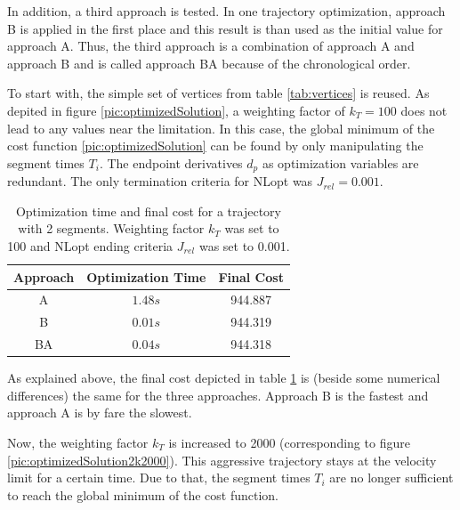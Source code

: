 In addition, a third approach is tested. In one trajectory optimization, approach B is applied in the first place and this result is than used as the initial value for approach A. Thus, the third approach is a combination of approach A and approach B and is called approach BA because of the chronological order. \newline

To start with, the simple set of vertices from table \ref{tab:vertices} is reused. As depited in figure \ref{pic:optimizedSolution}, a weighting factor of $k_T = 100$ does not lead to any values near the limitation. In this case, the global minimum of the cost function \ref{pic:optimizedSolution} can be found by only manipulating the segment times $T_i$. The endpoint derivatives $d_p$ as optimization variables are redundant. The only termination criteria for NLopt was $J_{rel} = 0.001$.



\begin{table}[H] 
\begin{center}
    \begin{tabular}{| c | c |  c |}
    \hline
    Approach & Optimization Time & Final Cost \\ \hline
  A & $1.48s$ & 944.887 \\ \hline
  B & $0.01s$ & 944.319 \\ \hline
 BA & $0.04s$ & 944.318 \\
    \hline
    \end{tabular}
    \caption{Optimization time and final cost for a trajectory with 2 segments. Weighting factor $k_T$ was set to 100 and NLopt ending criteria $J_{rel}$ was set to 0.001.}
    \label{tab:ABBA1}
\end{center}
\end{table}


As explained above, the final cost depicted in table \ref{tab:ABBA1} is (beside some numerical differences) the same for the three approaches. Approach B is the fastest and approach A is by fare the slowest. \newline

Now, the weighting factor $k_T$ is increased to 2000 (corresponding to figure \ref{pic:optimizedSolution2k2000}). This  aggressive trajectory stays at the velocity limit for a certain time. Due to that, the segment times $T_i$ are no longer sufficient to reach the global minimum of the cost function.

